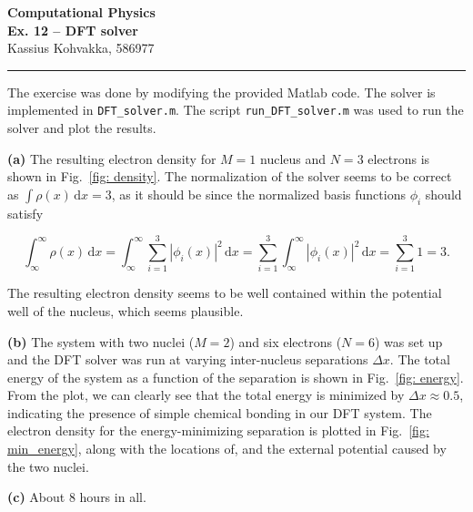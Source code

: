 \documentclass[a4paper,12pt]{article}
\newcommand{\dd}{\,\mathrm{d}}
\newcommand{\exerline}{
\vspace*{.1cm}
\noindent \rule{\textwidth}{1pt}
\vspace*{.1cm}
}
\begin{document}
\begin{minipage}[t][1.5cm][b]{\textwidth}
\begin{center}
\Large{\textbf{Computational Physics}} \\
\vspace*{.1cm}
\Large{\textbf{Ex. 12 -- DFT solver}}\\
\vspace*{.1cm}
\large{Kassius Kohvakka, 586977}
\end{center}
\end{minipage} 
\vspace{-0.4cm}

\exerline

The exercise was done by modifying the provided Matlab code. The solver is implemented in \texttt{DFT\_solver.m}. The script \texttt{run\_DFT\_solver.m} was used to run the solver and plot the results.

\textbf{(a)} The resulting electron density for $M=1$ nucleus and $N=3$ electrons is shown in Fig.~\ref{fig: density}. The normalization of the solver seems to be correct as $\int \rho (x) \dd x = 3$, as it should be since the normalized basis functions $\phi_i$ should satisfy

\begin{equation}
\int_\infty^\infty \rho (x) \dd x = \int_\infty^\infty \sum_{i=1}^{3} |\phi_i(x)|^2 \dd x = \sum_{i=1}^{3} \int_\infty^\infty |\phi_i(x)|^2 \dd x = \sum_{i=1}^{3} 1 = 3.
\end{equation}

The resulting electron density seems to be well contained within the potential well of the nucleus, which seems plausible.

\textbf{(b)} The system with two nuclei ($M=2$) and six electrons ($N=6$) was set up and the DFT solver was run at varying inter-nucleus separations $\Delta x$. The total energy of the system as a  function of the separation is shown in Fig.~\ref{fig: energy}. From the plot, we can clearly see that the total energy is minimized by $\Delta x \approx 0.5$, indicating the presence of simple chemical bonding in our DFT system. The electron density for the energy-minimizing separation is plotted in Fig.~\ref{fig: min_energy}, along with the locations of, and the external potential caused by the two nuclei.

\textbf{(c)} About 8 hours in all.
\end{document}

